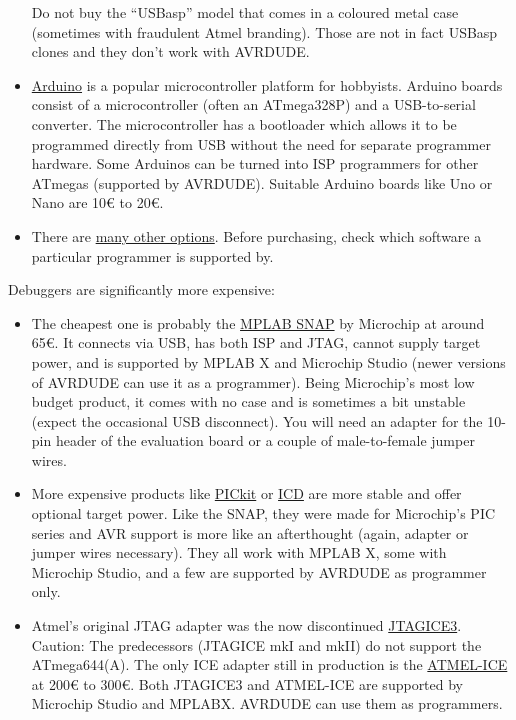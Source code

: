 \documentclass{article}
\newenvironment{caution}{\begin{tcolorbox}[colback=red!5!white,colframe=red!75!black,title=\textbf{Caution}]}{\end{tcolorbox}}
\begin{document}
\begin{itemize}
\begin{caution}
Do not buy the ``USBasp'' model that comes in a coloured metal case (sometimes with fraudulent Atmel branding). Those are not in fact USBasp clones and they don't work with AVRDUDE. 
\end{caution}
\item \href{https://www.arduino.cc/}{Arduino} is a popular microcontroller platform for hobbyists. Arduino boards consist of a microcontroller (often an ATmega328P) and a USB-to-serial converter. The microcontroller has a bootloader which allows it to be programmed directly from USB without the need for separate programmer hardware. Some Arduinos can be turned into ISP programmers for other ATmegas (supported by AVRDUDE). Suitable Arduino boards like Uno or Nano are 10\euro{} to 20\euro. 
\item There are \href{https://www.mikrocontroller.net/articles/AVR_In_System_Programmer#Programmer-Varianten}{many other options}. Before purchasing, check which software a particular programmer is supported by. 
\end{itemize}

Debuggers are significantly more expensive:

\begin{itemize}
\item The cheapest one is probably the \href{https://www.microchip.com/en-us/development-tool/pg164100}{MPLAB SNAP} by Microchip at around 65\euro. It connects via USB, has both ISP and JTAG, cannot supply target power, and is supported by MPLAB X and Microchip Studio (newer versions of AVRDUDE can use it as a programmer). Being Microchip's most low budget product, it comes with no case and is sometimes a bit unstable (expect the occasional USB disconnect). You will need an adapter for the 10-pin header of the evaluation board or a couple of male-to-female jumper wires. 
\item More expensive products like \href{https://www.microchip.com/en-us/development-tool/pg164140}{PICkit} or \href{https://www.microchip.com/en-us/development-tool/dv164045}{ICD} are more stable and offer optional target power. Like the SNAP, they were made for Microchip's PIC series and AVR support is more like an afterthought (again, adapter or jumper wires necessary). They all work with MPLAB X, some with Microchip Studio, and a few are supported by AVRDUDE as programmer only. 
\item Atmel's original JTAG adapter was the now discontinued \href{https://www.microchip.com/en-us/development-tool/ATJTAGICE3}{JTAGICE3}. Caution: The predecessors (JTAGICE mkI and mkII) do not support the ATmega644(A). The only ICE adapter still in production is the \href{https://www.microchip.com/en-us/development-tool/atatmel-ice}{ATMEL-ICE} at 200\euro{} to 300\euro. Both JTAGICE3 and ATMEL-ICE are supported by Microchip Studio and MPLABX. AVRDUDE can use them as programmers. 
\end{itemize}
\end{document}
